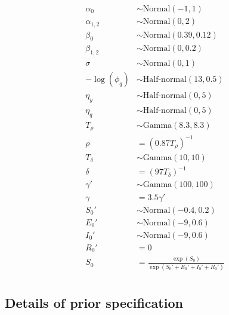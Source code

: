 \documentclass[12pt,letterpaper]{article}
\begin{document}
\begin{align}
\alpha_0 & \sim \text{Normal}(-1, 1)\\ 
\alpha_{1,2} & \sim \text{Normal}(0, 2)\\
\beta_0 & \sim \text{Normal}(0.39, 0.12)\\
\beta_{1,2} & \sim \text{Normal}(0, 0.2)\\
\sigma & \sim \text{Normal}(0, 1)\\
-\log(\phi_q) & \sim \text{Half-normal}(13, 0.5)\\
\eta_y &\sim \text{Half-normal}(0, 5)\\
\eta_q & \sim \text{Half-normal}(0, 5)\\
T_{\rho} & \sim \text{Gamma}(8.3, 8.3)\\
\rho & = (0.87 T_{\rho})^{-1}\\
T_{\delta} & \sim \text{Gamma}(10, 10)\\
\delta & = (97 T_{\delta})^{-1}\\
\gamma' & \sim \text{Gamma}(100, 100)\\
\gamma & = 3.5\gamma'\\
S_0' & \sim \text{Normal}(-0.4, 0.2)\\
E_0' & \sim \text{Normal}(-9, 0.6)\\
I_0' & \sim \text{Normal}(-9, 0.6)\\
R_0' & = 0\\
S_0 & = \frac{\exp(S_0)}{\exp(S_0' + E_0' + I_0' + R_0')} \\
\end{align}

\subsection*{Details of prior specification}
\end{document}
